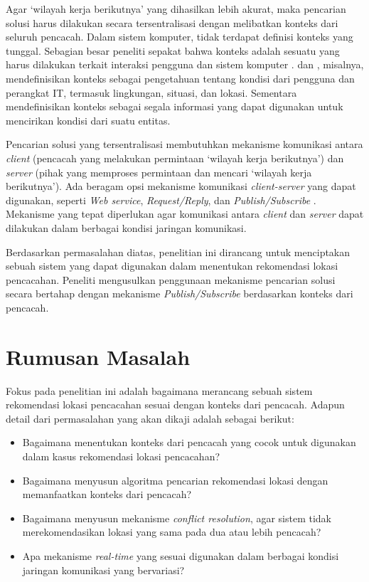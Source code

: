 Agar `wilayah kerja berikutnya' yang dihasilkan lebih akurat, maka pencarian solusi harus dilakukan secara tersentralisasi dengan melibatkan konteks dari seluruh pencacah. Dalam sistem komputer, tidak terdapat definisi konteks yang tunggal. Sebagian besar peneliti sepakat bahwa konteks adalah sesuatu yang harus dilakukan terkait interaksi pengguna dan sistem komputer \citep{chen_survey_2000}. \citep{schilit_context-aware_1994} dan  \citep{schmidt_there_1999}, misalnya, mendefinisikan konteks sebagai pengetahuan tentang kondisi dari pengguna dan perangkat IT, termasuk lingkungan, situasi, dan lokasi. Sementara \citep{abowd_towards_1999} mendefinisikan konteks sebagai segala informasi yang dapat digunakan untuk mencirikan kondisi dari suatu entitas.


Pencarian solusi yang tersentralisasi membutuhkan mekanisme komunikasi antara \textit{client} (pencacah yang melakukan permintaan `wilayah kerja berikutnya') dan \textit{server} (pihak yang memproses permintaan dan mencari `wilayah kerja berikutnya'). Ada beragam opsi mekanisme komunikasi \textit{client-server} yang dapat digunakan, seperti \textit{Web service}, \textit{Request/Reply}, dan \textit{Publish/Subscribe} \citep{weise_solving_2009, sengoku_fast_1998, sarmenta_bayanihan_2002, muhl_large-scale_2002}. Mekanisme yang tepat diperlukan agar komunikasi antara \textit{client} dan \textit{server} dapat dilakukan dalam berbagai kondisi jaringan komunikasi.


Berdasarkan permasalahan diatas, penelitian ini dirancang untuk menciptakan sebuah sistem yang dapat digunakan dalam menentukan rekomendasi lokasi pencacahan. Peneliti mengusulkan penggunaan mekanisme pencarian solusi secara bertahap dengan mekanisme \textit{Publish/Subscribe} berdasarkan konteks dari pencacah. 


\section{Rumusan Masalah}
Fokus pada penelitian ini adalah bagaimana merancang sebuah sistem rekomendasi lokasi pencacahan sesuai dengan konteks dari pencacah. Adapun detail dari permasalahan yang akan dikaji adalah sebagai berikut:

\begin{itemize}
\item Bagaimana menentukan konteks dari pencacah yang cocok untuk digunakan dalam kasus rekomendasi lokasi pencacahan?
\item Bagaimana menyusun algoritma pencarian rekomendasi lokasi dengan memanfaatkan konteks dari pencacah?
\item Bagaimana menyusun mekanisme \textit{conflict resolution}, agar sistem tidak merekomendasikan lokasi yang sama pada dua atau lebih pencacah?
\item Apa mekanisme \textit{real-time} yang sesuai digunakan dalam berbagai kondisi jaringan komunikasi yang bervariasi?
\end{itemize}


